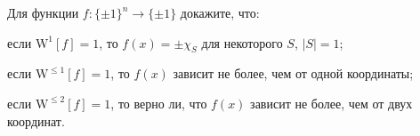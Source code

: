 Для функции $f\colon \{\pm 1\}^n \to \{\pm 1\}$ докажите, что:
\begin{enumcyr}
    \item если $\mathrm{W}^{1}[f] = 1$, то $f(x) = \pm \chi_{S}$ для некоторого $S$, $|S| = 1$;
    \item если $\mathrm{W}^{\le 1}[f] = 1$, то $f(x)$ зависит не более, чем от одной координаты;
    \item если $\mathrm{W}^{\le 2}[f] = 1$, то верно ли, что $f(x)$ зависит не более, чем от двух
        координат.
\end{enumcyr}